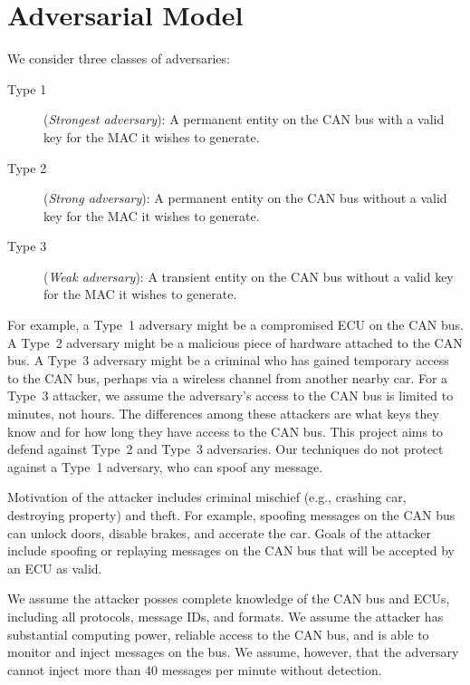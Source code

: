 \section{Adversarial Model}
\label{adversary}

We consider three classes of adversaries:

\begin{description}

	\item [Type 1]
	(\textit{Strongest adversary}): A permanent entity on the CAN bus with a valid key for the MAC it wishes to generate.
	
	\item [Type 2]
	(\textit{Strong adversary}): A permanent entity on the CAN bus without a valid key for the MAC it wishes to generate.
	
	\item [Type 3]
	(\textit{Weak adversary}): A transient entity on the CAN bus without a valid key for the MAC it wishes to generate.
	
\end{description}

For example, a Type~1 adversary might be a compromised ECU on the CAN bus.  A Type~2 adversary might be a malicious piece of hardware attached
to the CAN bus.  A Type~3 adversary might be a criminal who has gained temporary access to the CAN bus, perhaps via a wireless channel from
another nearby car.  For a Type~3 attacker, we assume the adversary's access to the CAN bus is limited to minutes, not hours.  
The differences among these attackers are what keys they know and for how long they have access to the CAN bus.
This project aims to defend against Type~2 and Type~3 adversaries.   Our techniques do not protect against 
a Type~1 adversary, who can spoof any message. 

Motivation of the attacker includes criminal mischief (e.g., crashing car, destroying property) and theft.  
For example, spoofing messages on the CAN bus can unlock doors, disable brakes, and accerate the car.
Goals of the attacker include spoofing or replaying messages on the CAN bus that will be accepted by an ECU
as valid.

We assume the attacker posses complete knowledge of the CAN bus and ECUs, including all protocols, message IDs, and formats.
We assume the attacker has substantial computing power, reliable access to the CAN bus, and is able to 
monitor and inject messages on the bus.  We assume, however, that the adversary cannot inject more than 40 messages
per minute without detection.

